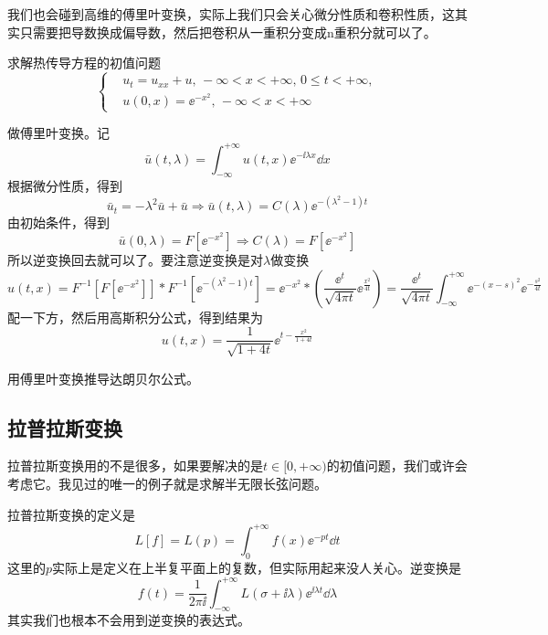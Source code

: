 我们也会碰到高维的傅里叶变换，实际上我们只会关心微分性质和卷积性质，这其实只需要把导数换成偏导数，然后把卷积从一重积分变成n重积分就可以了。
\begin{problembox}
    \begin{example}
        求解热传导方程的初值问题
        \begin{equation*}
            \left\{
                \begin{aligned}
                    &u_t = u_{xx} + u,\, -\infty < x < +\infty,\, 0 \leq t < +\infty,\\
                    &u(0, x) = \ee^{-x^2},\, -\infty < x < +\infty
                \end{aligned}
            \right.
        \end{equation*}
    \end{example}
    \begin{solution}
        做傅里叶变换。记
        \[\bar{u}(t, \lambda) = \int_{-\infty}^{+\infty} u(t, x) \ee^{- \ii \lambda x} \dd{x}\]
        根据微分性质，得到
        \[\bar{u}_t = -\lambda^2 \bar{u} + \bar{u} \Rightarrow \bar{u}(t, \lambda) = C(\lambda) \ee^{-\left(\lambda^2 - 1\right)t}\]
        由初始条件，得到
        \[\bar{u}(0, \lambda) = F[\ee^{-x^2}] \Rightarrow C(\lambda) = F[\ee^{-x^2}]\]
        所以逆变换回去就可以了。要注意逆变换是对$\lambda$做变换
        \[u(t, x) = F^{-1}\left[F[\ee^{-x^2}]\right] * F^{-1}[\ee^{-\left(\lambda^2 - 1\right)t}] = \ee^{-x^2} * \left(\frac{\ee^t}{\sqrt{4 \pi t}} \ee^{\frac{x^2}{4t}}\right) = \frac{\ee^{t}}{\sqrt{4 \pi t}}\int_{-\infty}^{+\infty} \ee^{-\left(x - s\right)^2} \ee^{-\frac{s^2}{4t}}\]
        配一下方，然后用高斯积分公式，得到结果为
        \[u(t, x) = \frac{1}{\sqrt{1 + 4t}} \ee^{t - \frac{x^2}{1 + 4t}}\]
    \end{solution}
\end{problembox}
\begin{problembox}
    \begin{exercise}
        用傅里叶变换推导达朗贝尔公式。
    \end{exercise}
\end{problembox}

\subsection{拉普拉斯变换}
拉普拉斯变换用的不是很多，如果要解决的是$t \in [0, +\infty)$的初值问题，我们或许会考虑它。我见过的唯一的例子就是求解半无限长弦问题。

拉普拉斯变换的定义是
\[L[f] = L(p) = \int_{0}^{+\infty} f(x) \ee^{-p t} \dd{t}\]
这里的$p$实际上是定义在上半复平面上的复数，但实际用起来没人关心。逆变换是
\[f(t) = \frac{1}{2 \pi \ii} \int_{-\infty}^{+\infty} L(\sigma + \ii \lambda) \ee^{\ii \lambda t} \dd{\lambda}\]
其实我们也根本不会用到逆变换的表达式。

